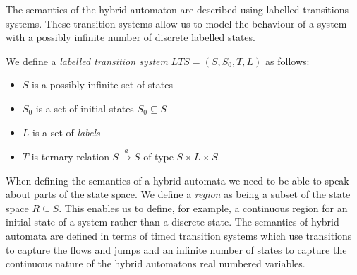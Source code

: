 The semantics of the hybrid automaton are described using labelled transitions systems. These transition systems allow us to model the behaviour of a system with a possibly infinite number of discrete labelled states. 
\medskip
\begin{mydef}
We define a \emph{labelled transition system} $LTS = (S,S_0,T,L)$ as follows:
\begin{itemize}

\item $S$ is a possibly infinite set of states

\item $S_0$ is a set of initial states $S_0 \subseteq S$

\item $L$ is a set of \emph{labels}

\item $T$ is ternary  relation $S \xrightarrow{a} S$ of type $S \times L \times S$.

\end{itemize}
\end{mydef}
\medskip
When defining the semantics of a hybrid automata we need to be able to speak about parts of the state space.  We define a \emph{region} as being a subset of the state space $R \subseteq S$.  This enables us to define, for example, a continuous region for an initial state of a system rather than a discrete state. The semantics of hybrid automata are defined in terms of  timed transition systems which use transitions to capture the flows and jumps and an infinite number of states to capture the continuous nature of the hybrid automatons real numbered variables.

